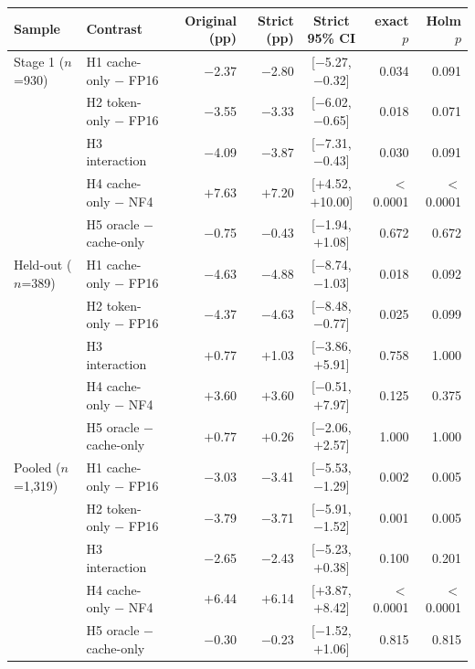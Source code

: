\begin{tabular}{llrrcrr}
\toprule
Sample & Contrast & Original (pp) & Strict (pp) & Strict 95\% CI & exact $p$ & Holm $p$ \\
\midrule
Stage 1 ($n$=930) & H1 cache-only $-$ FP16 & $-$2.37 & $-$2.80 & [$-$5.27, $-$0.32] & 0.034 & 0.091 \\
 & H2 token-only $-$ FP16 & $-$3.55 & $-$3.33 & [$-$6.02, $-$0.65] & 0.018 & 0.071 \\
 & H3 interaction & $-$4.09 & $-$3.87 & [$-$7.31, $-$0.43] & 0.030 & 0.091 \\
 & H4 cache-only $-$ NF4 & $+$7.63 & $+$7.20 & [$+$4.52, $+$10.00] & $<$0.0001 & $<$0.0001 \\
 & H5 oracle $-$ cache-only & $-$0.75 & $-$0.43 & [$-$1.94, $+$1.08] & 0.672 & 0.672 \\
\midrule
Held-out ($n$=389) & H1 cache-only $-$ FP16 & $-$4.63 & $-$4.88 & [$-$8.74, $-$1.03] & 0.018 & 0.092 \\
 & H2 token-only $-$ FP16 & $-$4.37 & $-$4.63 & [$-$8.48, $-$0.77] & 0.025 & 0.099 \\
 & H3 interaction & $+$0.77 & $+$1.03 & [$-$3.86, $+$5.91] & 0.758 & 1.000 \\
 & H4 cache-only $-$ NF4 & $+$3.60 & $+$3.60 & [$-$0.51, $+$7.97] & 0.125 & 0.375 \\
 & H5 oracle $-$ cache-only & $+$0.77 & $+$0.26 & [$-$2.06, $+$2.57] & 1.000 & 1.000 \\
\midrule
Pooled ($n$=1{,}319) & H1 cache-only $-$ FP16 & $-$3.03 & $-$3.41 & [$-$5.53, $-$1.29] & 0.002 & 0.005 \\
 & H2 token-only $-$ FP16 & $-$3.79 & $-$3.71 & [$-$5.91, $-$1.52] & 0.001 & 0.005 \\
 & H3 interaction & $-$2.65 & $-$2.43 & [$-$5.23, $+$0.38] & 0.100 & 0.201 \\
 & H4 cache-only $-$ NF4 & $+$6.44 & $+$6.14 & [$+$3.87, $+$8.42] & $<$0.0001 & $<$0.0001 \\
 & H5 oracle $-$ cache-only & $-$0.30 & $-$0.23 & [$-$1.52, $+$1.06] & 0.815 & 0.815 \\

\bottomrule
\end{tabular}
